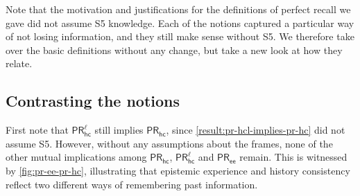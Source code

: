 \documentclass{article}
\newcommand{\PRhc}{\ensuremath{\mathsf{PR_{hc}}}\xspace}
\newcommand{\PRhcl}{\ensuremath{\mathsf{PR_{hc}^\ell}}\xspace}
\newcommand{\PRee}{\ensuremath{\mathsf{PR_{ee}}}\xspace}
\newcounter{#1}
\begin{document}
\medskip

Note that the motivation and justifications for the definitions of perfect recall we gave
did not assume S5 knowledge.
Each of the notions captured a particular way of not losing information,
and they still make sense without S5.
We therefore take over the basic definitions without any change,
but take a new look at how they relate.

\subsection{Contrasting the notions}
\label{sec:contrasting-notions}

First note that \PRhcl still implies \PRhc,
since \cref{result:pr-hcl-implies-pr-hc} did not assume S5.
However, without any assumptions about the frames,
none of the other mutual implications among \PRhc, \PRhcl and \PRee remain.
This is witnessed by \cref{fig:pr-ee-pr-hc},
illustrating that epistemic experience and history consistency
reflect two different ways of remembering past information.
\end{document}
